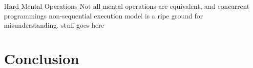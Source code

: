 \documentclass{sig-alternate}
\begin{document}
Hard Mental Operations
Not all mental operations are equivalent, and concurrent programmings non-sequential execution model is a ripe ground for misunderstanding. stuff goes here

\section{Conclusion}





\end{document}
